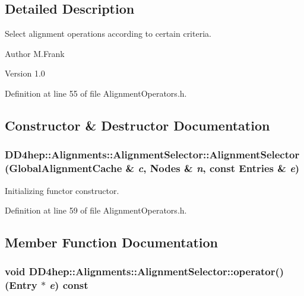 \subsection{Detailed Description}
Select alignment operations according to certain criteria. \begin{DoxyAuthor}{Author}
M.Frank 
\end{DoxyAuthor}
\begin{DoxyVersion}{Version}
1.0 
\end{DoxyVersion}


Definition at line 55 of file AlignmentOperators.h.

\subsection{Constructor \& Destructor Documentation}
\hypertarget{class_d_d4hep_1_1_alignments_1_1_alignment_selector_a00da94ed989a3b504636f2c22ad6641e}{
\subsubsection[{AlignmentSelector}]{\setlength{\rightskip}{0pt plus 5cm}DD4hep::Alignments::AlignmentSelector::AlignmentSelector ({\bf GlobalAlignmentCache} \& {\em c}, \/  {\bf Nodes} \& {\em n}, \/  const {\bf Entries} \& {\em e})}}
\label{class_d_d4hep_1_1_alignments_1_1_alignment_selector_a00da94ed989a3b504636f2c22ad6641e}


Initializing functor constructor. 

Definition at line 59 of file AlignmentOperators.h.

\subsection{Member Function Documentation}
\hypertarget{class_d_d4hep_1_1_alignments_1_1_alignment_selector_a2aeb642263c81aa468c218bc67fa70d6}{
\subsubsection[{operator()}]{\setlength{\rightskip}{0pt plus 5cm}void DD4hep::Alignments::AlignmentSelector::operator() ({\bf Entry} $\ast$ {\em e}) const}}
\label{class_d_d4hep_1_1_alignments_1_1_alignment_selector_a2aeb642263c81aa468c218bc67fa70d6}


